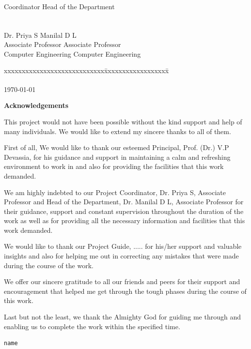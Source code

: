 \documentclass[11pt]{report}
\begin{document}
\begin{titlepage}
\begin{tabbing}
Coordinator\>\> Head of the Department
\\
\\
\\
Dr. Priya S \>\>Manilal D L\\
Associate Professor	\>\> Associate Professor\\
Computer Engineering	\>\>	Computer Engineering
\end{tabbing}
\vspace{.08in}
%
\begin{tabbing}
xxxxxxxxxxxxxxxxxxxxxxxxxxxx\= xxxxxxxxxxxxxxxxxx\= \kill
\\
\\
\today
\end{tabbing}

\end{titlepage}


\begin{titlepage}
\vspace{.25in}	
\begin{center}
\textbf{Acknowledgements}\\
\end{center}
\normalsize

This project would not have been possible without the kind support and help of many individuals. We would like to extend my sincere thanks to all of them.
  
First of all, We would like to thank our esteemed Principal, Prof. (Dr.) V.P Devassia, for his guidance and support in maintaining a calm and refreshing environment to work in and also for providing the facilities that this work demanded.
  
We am highly indebted to our Project Coordinator, Dr. Priya S, Associate Professor and Head of the Department, Dr. Manilal D L, Associate Professor for their guidance, support and constant supervision throughout the duration of the work as well as for providing all the necessary information and facilities that this work demanded.

We would like to thank our Project Guide, ..... for his/her support and valuable insights and also for helping me out in correcting any mistakes that were made during the course of the work. 
  
We offer our sincere gratitude to all our friends and peers for their support and encouragement that helped me get through the tough phases during the course of this work.
  
Last but not the least, we thank the Almighty God for guiding me through and enabling us to complete the work within the specified time.
\vspace{.25in}

\vspace{.25in}


\flushleft \small{\texttt{name}}
 
\end{titlepage}
\end{document}
